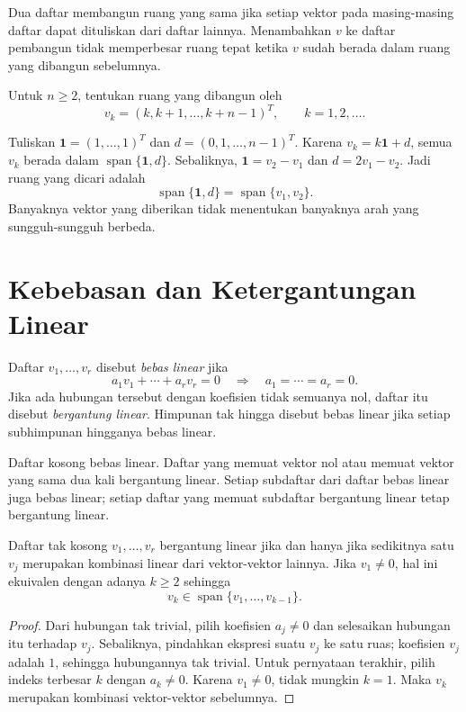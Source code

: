 Dua daftar membangun ruang yang sama jika setiap vektor pada
masing-masing daftar dapat dituliskan dari daftar lainnya.
Menambahkan $v$ ke daftar pembangun tidak memperbesar ruang
tepat ketika $v$ sudah berada dalam ruang yang dibangun sebelumnya.

\begin{exam}
    Untuk $n\ge2$, tentukan ruang yang dibangun oleh
    \[
        v_k=(k,k+1,\ldots,k+n-1)^T,\qquad k=1,2,\ldots.
    \]
\end{exam}
\begin{solution}
    Tuliskan $\boldsymbol{1}=(1,\ldots,1)^T$ dan
    $d=(0,1,\ldots,n-1)^T$. Karena $v_k=k\boldsymbol{1}+d$,
    semua $v_k$ berada dalam $\operatorname{span}\{\boldsymbol{1},d\}$.
    Sebaliknya, $\boldsymbol{1}=v_2-v_1$ dan $d=2v_1-v_2$.
    Jadi ruang yang dicari adalah
    \[
        \operatorname{span}\{\boldsymbol{1},d\}
        =\operatorname{span}\{v_1,v_2\}.
    \]
    Banyaknya vektor yang diberikan tidak menentukan banyaknya
    arah yang sungguh-sungguh berbeda.
\end{solution}

\section{Kebebasan dan Ketergantungan Linear}

\begin{definisi}
    Daftar $v_1,\ldots,v_r$ disebut \emph{bebas linear} jika
    \[
        a_1v_1+\cdots+a_rv_r=0
        \quad\Longrightarrow\quad a_1=\cdots=a_r=0.
    \]
    Jika ada hubungan tersebut dengan koefisien tidak semuanya
    nol, daftar itu disebut \emph{bergantung linear}.
    Himpunan tak hingga disebut bebas linear jika setiap
    subhimpunan hingganya bebas linear.
\end{definisi}

Daftar kosong bebas linear. Daftar yang memuat vektor nol atau
memuat vektor yang sama dua kali bergantung linear. Setiap
subdaftar dari daftar bebas linear juga bebas linear; setiap
daftar yang memuat subdaftar bergantung linear tetap bergantung linear.

\begin{teorema}
    Daftar tak kosong $v_1,\ldots,v_r$ bergantung linear jika dan
    hanya jika sedikitnya satu $v_j$ merupakan kombinasi linear
    dari vektor-vektor lainnya.
    Jika $v_1\ne0$, hal ini ekuivalen dengan adanya $k\ge2$ sehingga
    \[
        v_k\in\operatorname{span}\{v_1,\ldots,v_{k-1}\}.
    \]
\end{teorema}
\begin{proof}
    Dari hubungan tak trivial, pilih koefisien $a_j\ne0$ dan
    selesaikan hubungan itu terhadap $v_j$. Sebaliknya, pindahkan
    ekspresi suatu $v_j$ ke satu ruas; koefisien $v_j$ adalah $1$,
    sehingga hubungannya tak trivial.
    Untuk pernyataan terakhir, pilih indeks terbesar $k$ dengan
    $a_k\ne0$. Karena $v_1\ne0$, tidak mungkin $k=1$.
    Maka $v_k$ merupakan kombinasi vektor-vektor sebelumnya.
\end{proof}


